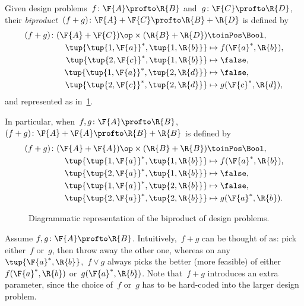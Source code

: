 \begin{definition}
  Given design problems~$f\colon \F{A} \profto \R{B}$ and~$g\colon \F{C} \profto \R{D}$, their \emph{biproduct}~$(f + g)\colon \F{A} + \F{C} \profto \R{B} + \R{D}$ is defined by
  \begin{equation}
    \begin{aligned}
      (f + g)\colon (\F{A} + \F{C})\op  \times (\R{B} + \R{D}) & \toinPos \Bool,  \\
      \tup{ \tup{1,\F{a}}^*, \tup{1,\R{b}}} & \mapsto f(\F{a}^*, \R{b}), \\
      \tup{ \tup{2,\F{c}}^*, \tup{1,\R{b}}} & \mapsto \false, \\
      \tup{ \tup{1,\F{a}}^*, \tup{2,\R{d}}} & \mapsto \false, \\
      \tup{ \tup{2,\F{c}}^*, \tup{2,\R{d}}} & \mapsto g(\F{c}^*, \R{d}),
    \end{aligned}
  \end{equation}
  and represented as in~\cref{fig:biproductdp}.

  In particular, when~$f, g\colon \F{A} \profto \R{B}$,~$(f + g)\colon \F{A} + \F{A} \profto \R{B} + \R{B}$ is defined by
  \begin{equation}
    \begin{aligned}
      (f + g) \colon (\F{A} + \F{A})\op  \times (\R{B} + \R{B}) & \toinPos \Bool,  \\
      \tup{ \tup{1, \F{a}}^*, \tup{1, \R{b}}} & \mapsto f(\F{a}^*, \R{b}), \\
      \tup{ \tup{2, \F{a}}^*, \tup{1, \R{b}}} & \mapsto \false, \\
      \tup{ \tup{1, \F{a}}^*, \tup{2, \R{b}}} & \mapsto \false, \\
      \tup{ \tup{2, \F{a}}^*, \tup{2, \R{b}}} & \mapsto g(\F{a}^*, \R{b}).
    \end{aligned}
  \end{equation}
\end{definition}

\begin{figure}[h!]
  \begin{center}
  \end{center}
  \caption{Diagrammatic representation of the biproduct of design problems. \label{fig:biproductdp}}
\end{figure}


Assume $f,g \colon \F{A} \profto \R{B}$. Intuitively,~$f+g$ can be thought of as: pick either~$f$ or~$g$, then throw away the other one, whereas on any~$\tup{\F{a}^*,\R{b}}$,~$f \vee g$ always picks the better (more feasible) of either~$f(\F{a}^*,\R{b})$ or~$g(\F{a}^*,\R{b})$. Note that~$f+g$ introduces an extra parameter, since the choice of~$f$ or~$g$ has to be hard-coded into the larger design problem.


